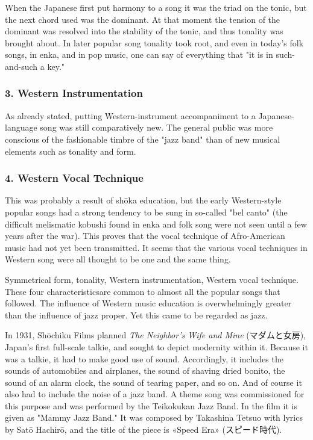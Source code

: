 When the Japanese first put harmony to a song it was the triad on the tonic, but the next chord used was the dominant. At that moment the tension of the dominant was resolved into the stability of the tonic, and thus tonality was brought about. In later popular song tonality took root, and even in today's folk songs, in enka, and in pop music, one can say of everything that "it is in such-and-such a key."

\subsubsection{3. Western Instrumentation}

As already stated, putting Western-instrument accompaniment to a Japanese-language song was still comparatively new. The general public was more conscious of the fashionable timbre of the "jazz band" than of new musical elements such as tonality and form.

\subsubsection{4. Western Vocal Technique}

This was probably a result of shōka education, but the early Western-style popular songs had a strong tendency to be sung in so-called "bel canto" (the difficult melismatic kobushi found in enka and folk song were not seen until a few years after the war). This proves that the vocal technique of Afro-American music had not yet been transmitted. It seems that the various vocal techniques in Western song were all thought to be one and the same thing.

Symmetrical form, tonality, Western instrumentation, Western vocal technique. These four characteristicsare common to almost all the popular songs that followed. The influence of Western music education is overwhelmingly greater than the influence of jazz proper. Yet this came to be regarded as jazz.

In 1931, Shōchiku Films planned \textit{The Neighbor's Wife and Mine} (マダムと女房), Japan's first full-scale talkie, and sought to depict modernity within it. Because it was a talkie, it had to make good use of sound. Accordingly, it includes the sounds of automobiles and airplanes, the sound of shaving dried bonito, the sound of an alarm clock, the sound of tearing paper, and so on. And of course it also had to include the noise of a jazz band. A theme song was commissioned for this purpose and was performed by the Teikokukan Jazz Band. In the film it is given as "Mammy Jazz Band." It was composed by Takashina Tetsuo with lyrics by Satō Hachirō, and the title of the piece is «Speed Era» (スピード時代).

